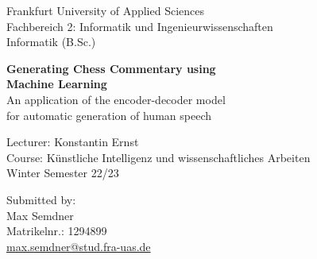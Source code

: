\begin{titlepage}
\begin{flushleft}
Frankfurt University of Applied Sciences\\
Fachbereich 2: Informatik und Ingenieurwissenschaften\\
Informatik (B.Sc.)\\
\end{flushleft}

\vspace{3.5cm}

\begin{center}
\Large
\textbf{Generating Chess Commentary using\\Machine Learning}\\
\vspace{0.3cm}
\large
An application of the encoder-decoder model\\
for automatic generation of human speech
\end{center}

\vspace{9.8cm}
	
\begin{flushright}
Lecturer: Konstantin Ernst\\
Course: Künstliche Intelligenz und wissenschaftliches Arbeiten\\
Winter Semester 22/23\\
\end{flushright}

\vspace{2cm}

\begin{flushleft}
Submitted by:\\
Max Semdner\\
Matrikelnr.: 1294899\\
\href{mailto: max.semdner@stud.fra-uas.de}{max.semdner@stud.fra-uas.de}\\
\end{flushleft}

\end{titlepage}